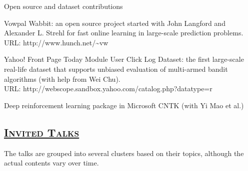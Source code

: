 \documentclass[10pt,twoside,letterpaper]{article}
\newcommand{\negitemspace}{\vspace{1mm}}
\begin{document}
\begin{compactitem}
\item{Open source and dataset contributions} \negitemspace

\begin{compactitem}

\item{Vowpal Wabbit: an open source project started with John Langford and
Alexander L. Strehl for fast online learning in large-scale
prediction problems.  URL: http://www.hunch.net/\~{}vw~}

\item{Yahoo! Front Page Today Module User Click Log Dataset: the first large-scale real-life dataset that supports unbiased evaluation of multi-armed bandit algorithms (with help from Wei Chu).  \\ URL: http://webscope.sandbox.yahoo.com/catalog.php?datatype=r}

\item{Deep reinforcement learning package in Microsoft CNTK (with Yi Mao et al.)}

\end{compactitem} \negitemspace

\end{compactitem}

\subsection*{\textsc{\underline{Invited Talks}}}

The talks are grouped into several clusters based on their topics, although the actual contents vary over time.
\end{document}
